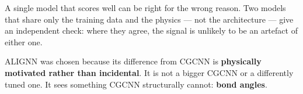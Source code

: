 \begin{frame}

{\sffamily\footnotesize
A single model that scores well can be right for the wrong reason. Two models
that share only the training data and the physics --- not the architecture ---
give an independent check: where they agree, the signal is unlikely to be an
artefact of either one.

\vspace{4pt}
ALIGNN was chosen because its difference from CGCNN is \textbf{physically
motivated rather than incidental}. It is not a bigger CGCNN or a differently
tuned one. It sees something CGCNN structurally cannot: \textbf{bond angles}.}

\vspace{6pt}
\begin{columns}[T]
\end{columns}

\end{frame}

